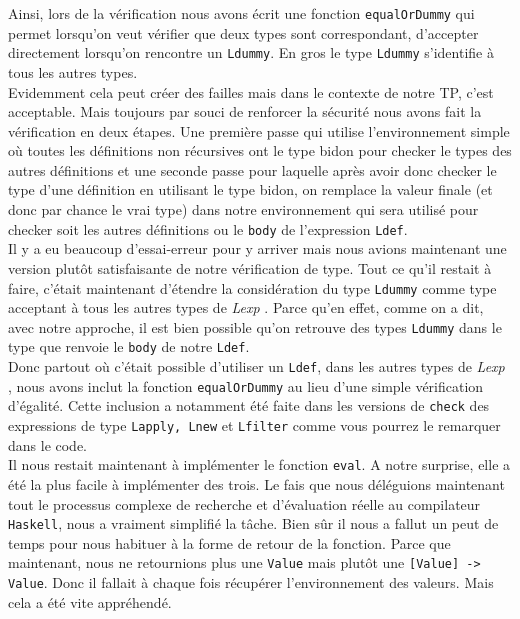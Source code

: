 \documentclass[11pt]{article}
\newcommand{\ch}{\texttt{check} }
\newcommand{\lexp}{\textit{Lexp} }
\begin{document}
	Ainsi, lors de la vérification nous avons écrit une fonction \texttt{equalOrDummy} qui permet lorsqu'on veut vérifier que deux types sont correspondant, d'accepter directement lorsqu'on rencontre un \texttt{Ldummy}. En gros le type \texttt{Ldummy} s'identifie à tous les autres types. \\
	
	Evidemment cela peut créer des failles mais dans le contexte de notre TP, c'est acceptable. Mais toujours par souci de renforcer la sécurité nous avons fait la vérification en deux étapes. Une première passe qui utilise l'environnement simple où toutes les définitions non récursives ont le type bidon pour checker le types des autres définitions et une seconde passe pour laquelle après avoir donc checker le type d'une définition en utilisant le type bidon, on remplace la valeur finale (et donc par chance le vrai type) dans notre environnement qui sera utilisé pour checker soit les autres définitions ou le \texttt{body} de l'expression \texttt{Ldef}.\\
	
	Il y a eu beaucoup d'essai-erreur pour y arriver mais nous avions maintenant une version plutôt satisfaisante de notre vérification de type. Tout ce qu'il restait à faire, c'était maintenant d'étendre la considération du type \texttt{Ldummy} comme type acceptant à tous les autres types de \lexp. Parce qu'en effet, comme on a dit, avec notre approche, il est bien possible qu'on retrouve des types \texttt{Ldummy} dans le type que renvoie le \texttt{body} de notre \texttt{Ldef}. \\
	
	Donc partout où c'était possible d'utiliser un \texttt{Ldef}, dans les autres types de \lexp, nous avons inclut la fonction \texttt{equalOrDummy} au lieu d'une simple vérification d'égalité. Cette inclusion a notamment été faite dans les versions de \ch des expressions de type \texttt{Lapply, Lnew} et \texttt{Lfilter} comme vous pourrez le remarquer dans le code.\\
	
	Il nous restait maintenant à implémenter le fonction \texttt{eval}. A notre surprise, elle a été la plus facile à implémenter des trois. Le fais que nous déléguions maintenant tout le processus complexe de recherche et d'évaluation réelle au compilateur \texttt{Haskell}, nous a vraiment simplifié la tâche. Bien sûr il nous a fallut un peut de temps pour nous habituer à la forme de retour de la fonction. Parce que maintenant, nous ne retournions plus une \texttt{Value} mais plutôt une \texttt{[Value] -> Value}. Donc il fallait à chaque fois récupérer l'environnement des valeurs. Mais cela a été vite appréhendé. \\
	
\end{document}
